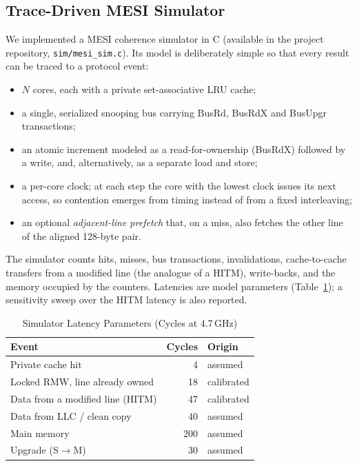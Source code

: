 \documentclass[journal]{IEEEtran}
\begin{document}
\subsection{Trace-Driven MESI Simulator}
We implemented a MESI coherence simulator in C (available in the project
repository, \texttt{sim/mesi\_sim.c}). Its model is deliberately simple so that
every result can be traced to a protocol event:
\begin{itemize}
  \item $N$ cores, each with a private set-associative LRU cache;
  \item a single, serialized snooping bus carrying BusRd, BusRdX and BusUpgr
        transactions;
  \item an atomic increment modeled as a read-for-ownership (BusRdX) followed
        by a write, and, alternatively, as a separate load and store;
  \item a per-core clock; at each step the core with the lowest clock issues
        its next access, so contention emerges from timing instead of from a
        fixed interleaving;
  \item an optional \emph{adjacent-line prefetch} that, on a miss, also
        fetches the other line of the aligned 128-byte pair.
\end{itemize}
The simulator counts hits, misses, bus transactions, invalidations,
cache-to-cache transfers from a modified line (the analogue of a HITM),
write-backs, and the memory occupied by the counters. Latencies are model
parameters (Table~\ref{tab:latencies}); a sensitivity sweep over the HITM
latency is also reported.

\begin{table}[!t]
\caption{Simulator Latency Parameters (Cycles at 4.7\,GHz)}
\label{tab:latencies}
\centering
\begin{tabular}{@{}lrl@{}}
\toprule
\textbf{Event} & \textbf{Cycles} & \textbf{Origin} \\
\midrule
Private cache hit & 4 & assumed \\
Locked RMW, line already owned & 18 & calibrated \\
Data from a modified line (HITM) & 47 & calibrated \\
Data from LLC / clean copy & 40 & assumed \\
Main memory & 200 & assumed \\
Upgrade (S$\rightarrow$M) & 30 & assumed \\
\bottomrule
\end{tabular}
\end{table}
\end{document}
